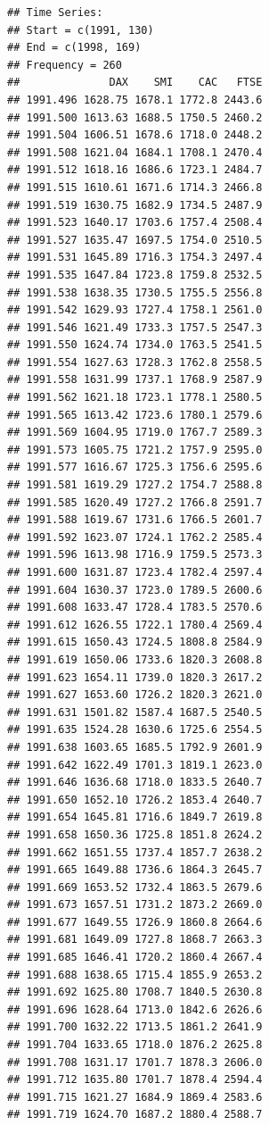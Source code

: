 \documentclass[
]{book}
\begin{document}
\begin{verbatim}
## Time Series:
## Start = c(1991, 130) 
## End = c(1998, 169) 
## Frequency = 260 
##              DAX    SMI    CAC   FTSE
## 1991.496 1628.75 1678.1 1772.8 2443.6
## 1991.500 1613.63 1688.5 1750.5 2460.2
## 1991.504 1606.51 1678.6 1718.0 2448.2
## 1991.508 1621.04 1684.1 1708.1 2470.4
## 1991.512 1618.16 1686.6 1723.1 2484.7
## 1991.515 1610.61 1671.6 1714.3 2466.8
## 1991.519 1630.75 1682.9 1734.5 2487.9
## 1991.523 1640.17 1703.6 1757.4 2508.4
## 1991.527 1635.47 1697.5 1754.0 2510.5
## 1991.531 1645.89 1716.3 1754.3 2497.4
## 1991.535 1647.84 1723.8 1759.8 2532.5
## 1991.538 1638.35 1730.5 1755.5 2556.8
## 1991.542 1629.93 1727.4 1758.1 2561.0
## 1991.546 1621.49 1733.3 1757.5 2547.3
## 1991.550 1624.74 1734.0 1763.5 2541.5
## 1991.554 1627.63 1728.3 1762.8 2558.5
## 1991.558 1631.99 1737.1 1768.9 2587.9
## 1991.562 1621.18 1723.1 1778.1 2580.5
## 1991.565 1613.42 1723.6 1780.1 2579.6
## 1991.569 1604.95 1719.0 1767.7 2589.3
## 1991.573 1605.75 1721.2 1757.9 2595.0
## 1991.577 1616.67 1725.3 1756.6 2595.6
## 1991.581 1619.29 1727.2 1754.7 2588.8
## 1991.585 1620.49 1727.2 1766.8 2591.7
## 1991.588 1619.67 1731.6 1766.5 2601.7
## 1991.592 1623.07 1724.1 1762.2 2585.4
## 1991.596 1613.98 1716.9 1759.5 2573.3
## 1991.600 1631.87 1723.4 1782.4 2597.4
## 1991.604 1630.37 1723.0 1789.5 2600.6
## 1991.608 1633.47 1728.4 1783.5 2570.6
## 1991.612 1626.55 1722.1 1780.4 2569.4
## 1991.615 1650.43 1724.5 1808.8 2584.9
## 1991.619 1650.06 1733.6 1820.3 2608.8
## 1991.623 1654.11 1739.0 1820.3 2617.2
## 1991.627 1653.60 1726.2 1820.3 2621.0
## 1991.631 1501.82 1587.4 1687.5 2540.5
## 1991.635 1524.28 1630.6 1725.6 2554.5
## 1991.638 1603.65 1685.5 1792.9 2601.9
## 1991.642 1622.49 1701.3 1819.1 2623.0
## 1991.646 1636.68 1718.0 1833.5 2640.7
## 1991.650 1652.10 1726.2 1853.4 2640.7
## 1991.654 1645.81 1716.6 1849.7 2619.8
## 1991.658 1650.36 1725.8 1851.8 2624.2
## 1991.662 1651.55 1737.4 1857.7 2638.2
## 1991.665 1649.88 1736.6 1864.3 2645.7
## 1991.669 1653.52 1732.4 1863.5 2679.6
## 1991.673 1657.51 1731.2 1873.2 2669.0
## 1991.677 1649.55 1726.9 1860.8 2664.6
## 1991.681 1649.09 1727.8 1868.7 2663.3
## 1991.685 1646.41 1720.2 1860.4 2667.4
## 1991.688 1638.65 1715.4 1855.9 2653.2
## 1991.692 1625.80 1708.7 1840.5 2630.8
## 1991.696 1628.64 1713.0 1842.6 2626.6
## 1991.700 1632.22 1713.5 1861.2 2641.9
## 1991.704 1633.65 1718.0 1876.2 2625.8
## 1991.708 1631.17 1701.7 1878.3 2606.0
## 1991.712 1635.80 1701.7 1878.4 2594.4
## 1991.715 1621.27 1684.9 1869.4 2583.6
## 1991.719 1624.70 1687.2 1880.4 2588.7

\end{verbatim}
\end{document}

